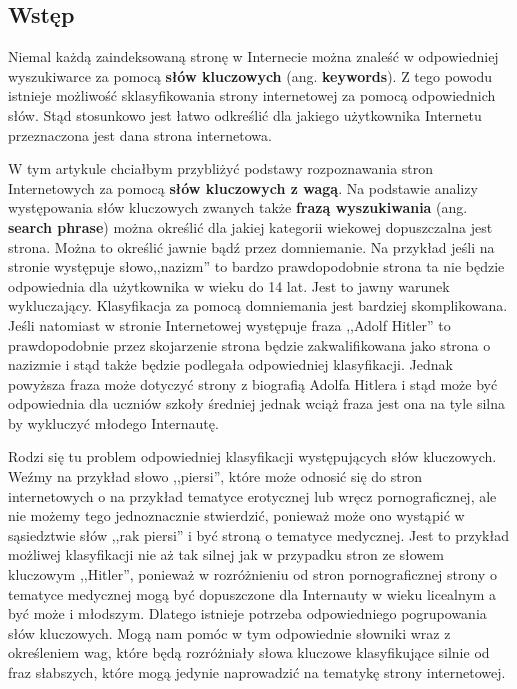 \documentclass[9pt,a4paper]{extarticle}
\begin{document}
\begin{multicols}{2}
\section{Wstęp}

\indent Niemal każdą zaindeksowaną stronę w Internecie można znaleść w odpowiedniej wyszukiwarce za pomocą \textbf{słów kluczowych} (ang.\textbf{ keywords}). Z tego powodu istnieje możliwość sklasyfikowania strony internetowej za pomocą odpowiednich słów. Stąd stosunkowo jest łatwo odkreślić dla jakiego użytkownika Internetu przeznaczona jest dana strona internetowa.

W tym artykule chciałbym przybliżyć podstawy rozpoznawania stron Internetowych za pomocą \textbf{słów kluczowych z wagą}. Na podstawie analizy występowania słów kluczowych zwanych także \textbf{frazą wyszukiwania} (ang. \textbf{search phrase}) można określić dla jakiej kategorii wiekowej dopuszczalna jest strona. Można to określić jawnie bądź przez domniemanie. Na przykład jeśli na stronie występuje słowo,,nazizm'' to bardzo prawdopodobnie strona ta nie będzie odpowiednia dla użytkownika w wieku do 14 lat. Jest to jawny warunek wykluczający. Klasyfikacja za pomocą domniemania jest bardziej skomplikowana. Jeśli natomiast w stronie Internetowej występuje fraza ,,Adolf Hitler'' to prawdopodobnie przez skojarzenie strona będzie zakwalifikowana jako strona o nazizmie i stąd także będzie podlegała odpowiedniej klasyfikacji. Jednak powyższa fraza może dotyczyć strony z biografią Adolfa Hitlera i stąd może być odpowiednia dla uczniów szkoły średniej jednak wciąż fraza jest ona na tyle silna by wykluczyć młodego Internautę. 

Rodzi się tu problem odpowiedniej klasyfikacji występujących słów kluczowych. Weźmy na przykład słowo ,,piersi'', które może odnosić się do stron internetowych o na przykład tematyce erotycznej lub wręcz pornograficznej, ale nie możemy tego jednoznacznie stwierdzić, ponieważ może ono wystąpić w sąsiedztwie słów ,,rak piersi'' i być stroną o tematyce medycznej. Jest to przykład możliwej klasyfikacji nie aż tak silnej jak w przypadku stron ze słowem kluczowym ,,Hitler'', ponieważ w rozróżnieniu od stron pornograficznej strony o tematyce medycznej mogą być dopuszczone dla Internauty w wieku licealnym a być może i młodszym. Dlatego istnieje potrzeba odpowiedniego pogrupowania słów kluczowych. Mogą nam pomóc w tym odpowiednie słowniki wraz z określeniem wag, które będą rozróżniały słowa kluczowe klasyfikujące silnie od fraz słabszych, które mogą jedynie naprowadzić na tematykę strony internetowej.


\end{multicols}
\end{document}
